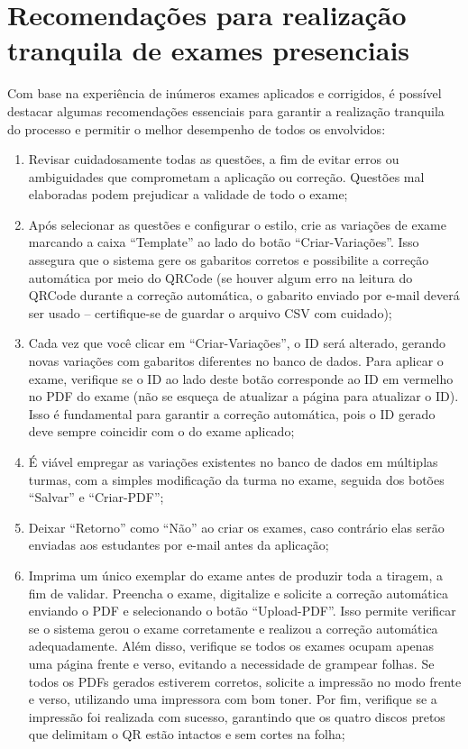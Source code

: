 
\section{Recomendações para realização tranquila de exames presenciais}\label{sec:recomendacoesCap8}

Com base na experiência de inúmeros exames aplicados e corrigidos, é possível destacar algumas recomendações essenciais para garantir a realização tranquila do processo e permitir o melhor desempenho de todos os envolvidos:

\begin{enumerate}
    \item Revisar cuidadosamente todas as questões, a fim de evitar erros ou ambiguidades que comprometam a aplicação ou correção. Questões mal elaboradas podem prejudicar a validade de todo o exame;
    \item Após selecionar as questões e configurar o estilo, crie as variações de exame marcando a caixa ``Template'' ao lado do botão ``Criar-Variações''. Isso assegura que o sistema gere os gabaritos corretos e possibilite a correção automática por meio do QRCode (se houver algum erro na leitura do QRCode durante a correção automática, o gabarito enviado por e-mail deverá ser usado -- certifique-se de guardar o arquivo CSV com cuidado);
    \item Cada vez que você clicar em ``Criar-Variações'', o ID será alterado, gerando novas variações com gabaritos diferentes no banco de dados. Para aplicar o exame, verifique se o ID ao lado deste botão corresponde ao ID em vermelho no PDF do exame (não se esqueça de atualizar a página para atualizar o ID). Isso é fundamental para garantir a correção automática, pois o ID gerado deve sempre coincidir com o do exame aplicado;
    \item É viável empregar as variações existentes no banco de dados em múltiplas turmas, com a simples modificação da turma no exame, seguida dos botões ``Salvar'' e ``Criar-PDF'';
    \item Deixar ``Retorno'' como ``Não'' ao criar os exames, caso contrário elas serão enviadas aos estudantes por e-mail antes da aplicação;
    \item Imprima um único exemplar do exame antes de produzir toda a tiragem, a fim de validar. Preencha o exame, digitalize e solicite a correção automática enviando o PDF e selecionando o botão ``Upload-PDF''. Isso permite verificar se o sistema gerou o exame corretamente e realizou a correção automática adequadamente. Além disso, verifique se todos os exames ocupam apenas uma página frente e verso, evitando a necessidade de grampear folhas. Se todos os PDFs gerados estiverem corretos, solicite a impressão no modo frente e verso, utilizando uma impressora com bom toner. Por fim, verifique se a impressão foi realizada com sucesso, garantindo que os quatro discos pretos que delimitam o QR estão intactos e sem cortes na folha;

\end{enumerate}
